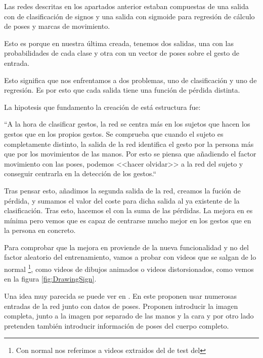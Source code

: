 Las redes descritas en los apartados anterior estaban compuestas de una salida con  de clasificación de signos y una salida con sigmoide para regresión de cálculo de poses y marcas de movimiento.

Esto es porque en nuestra última  creada, tenemos dos salidas, una con las probabilidades de cada clase y otra con un vector de poses sobre el gesto de entrada.

Esto significa que nos enfrentamos a dos problemas, uno de clasificación y uno de regresión. Es por esto que cada salida tiene una función de pérdida distinta.

La hipotesis que fundamento la creación de está estructura fue:

``A la hora de clasificar gestos, la red  se centra más en los sujetos que hacen los gestos que en los propios gestos. Se comprueba que cuando el sujeto es completamente distinto, la salida de la red identifica el gesto por la persona más que por los movimientos de las manos. Por esto se piensa que añadiendo el factor movimiento con las poses, podemos <<hacer olvidar>> a la red del sujeto y conseguir centrarla en la detección de los gestos.``

Tras pensar esto, añadimos la segunda salida de la red, creamos la fución de pérdida, y sumamos el valor del coste para dicha salida al ya existente de la clasificación. Tras esto, hacemos el  con la suma de las pérdidas. La mejora en  es mínima pero vemos que es capaz de centrarse mucho mejor en los gestos que en la persona en concreto.

Para comprobar que la mejora en  proviende de la nueva funcionalidad y no del factor aleatorio del entrenamiento, vamos a probar con videos que se salgan de lo normal \footnote{Con normal nos referimos a videos extraidos del  de test del }, como videos de dibujos animados o videos distorsionados, como vemos en la figura \ref{fig:DrawingSign}.



Una idea muy parecida se puede ver en . En este  proponen usar numerosas entradas de la red junto con datos de poses. Proponen introducir la imagen completa, junto a la imagen por separado de las manos y la cara y por otro lado pretenden también introducir información de poses del cuerpo completo.

